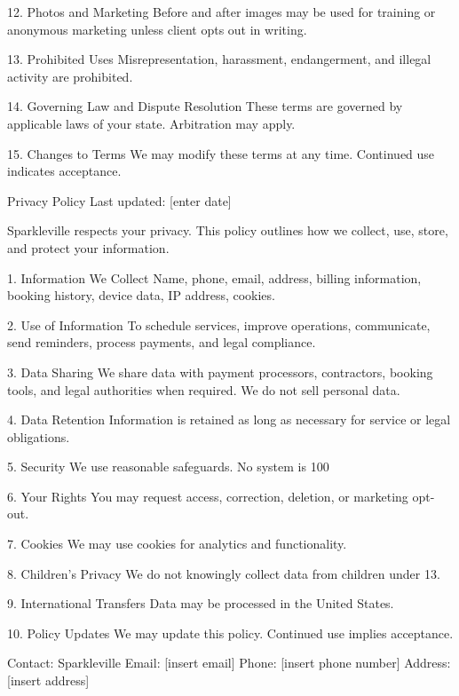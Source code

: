 12. Photos and Marketing
Before and after images may be used for training or anonymous marketing unless client opts out in writing.

13. Prohibited Uses
Misrepresentation, harassment, endangerment, and illegal activity are prohibited.

14. Governing Law and Dispute Resolution
These terms are governed by applicable laws of your state. Arbitration may apply.

15. Changes to Terms
We may modify these terms at any time. Continued use indicates acceptance.

Privacy Policy
Last updated: [enter date]

Sparkleville respects your privacy. This policy outlines how we collect, use, store, and protect your information.

1. Information We Collect
Name, phone, email, address, billing information, booking history, device data, IP address, cookies.

2. Use of Information
To schedule services, improve operations, communicate, send reminders, process payments, and legal compliance.

3. Data Sharing
We share data with payment processors, contractors, booking tools, and legal authorities when required. We do not sell personal data.

4. Data Retention
Information is retained as long as necessary for service or legal obligations.

5. Security
We use reasonable safeguards. No system is 100%

6. Your Rights
You may request access, correction, deletion, or marketing opt-out.

7. Cookies
We may use cookies for analytics and functionality.

8. Children’s Privacy
We do not knowingly collect data from children under 13.

9. International Transfers
Data may be processed in the United States.

10. Policy Updates
We may update this policy. Continued use implies acceptance.

Contact:
Sparkleville
Email: [insert email]
Phone: [insert phone number]
Address: [insert address]